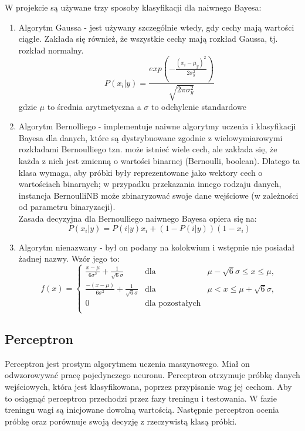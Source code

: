 \documentclass[12pt,a4paper]{article}
\begin{document}
            W projekcie są używane trzy sposoby klasyfikacji dla naiwnego Bayesa:
            \begin{enumerate}
                \item Algorytm Gaussa - jest używany szczególnie wtedy, gdy cechy mają wartości ciągłe. Zakłada się również, że wszystkie cechy mają rozkład Gaussa, tj. rozkład normalny.
                $$ P(x_{i}|y)=\frac{exp(- \frac{(x_{i}- \mu_{y})^2}{2\sigma_{y}^2})}{\sqrt{2\pi \sigma_{y}^2}} $$
                gdzie $\mu$ to średnia arytmetyczna a $\sigma$ to odchylenie standardowe
                \item Algorytm Bernolliego - implementuje naiwne algorytmy uczenia i klasyfikacji Bayesa dla danych, które są dystrybuowane zgodnie z wielowymiarowymi rozkładami Bernoulliego tzn. może istnieć wiele cech, ale zakłada się, że każda z nich jest zmienną o wartości binarnej (Bernoulli, boolean). Dlatego ta klasa wymaga, aby próbki były reprezentowane jako wektory cech o wartościach binarnych; w przypadku przekazania innego rodzaju danych, instancja BernoulliNB może zbinaryzować swoje dane wejściowe (w zależności od parametru binaryzacji).\\ Zasada decyzyjna dla Bernoulliego naiwnego Bayesa opiera się na:
                $$ P(x_{i}|y) = P(i|y)x_{i}+(1-P(i|y))(1-x_{i}) $$
                \item Algorytm nienazwany - był on podany na kolokwium i wstępnie nie posiadał żadnej nazwy. Wzór jego to: 
                $$f(x)=\left\{
                \begin{array}{ccc}
                \frac{x-\mu}{6\sigma^2}+\frac{1}{\sqrt{6}\sigma}&\mbox{dla}&\mu-\sqrt{6}\sigma \leq x \leq \mu,\\
                \frac{-(x-\mu)}{6\sigma^2}+\frac{1}{\sqrt{6}\sigma}&\mbox{dla}&\mu < x \leq \mu+\sqrt{6}\sigma,\\
                0&\mbox{dla pozostałych}&\\
                \end{array}
                \right.$$
            \end{enumerate}
            
	    
	    \subsection{Perceptron}
            Perceptron jest prostym algorytmem uczenia maszynowego. Miał on odwzorowywać pracę pojedynczego neuronu. Perceptron otrzymuje próbkę danych wejściowych, która jest klasyfikowana, poprzez przypisanie  wag jej cechom. Aby to osiągnąć perceptron przechodzi przez fazy treningu i testowania. W fazie treningu wagi są inicjowane dowolną wartością. Następnie perceptron ocenia próbkę oraz porównuje swoją decyzję z rzeczywistą klasą próbki.
\end{document}
